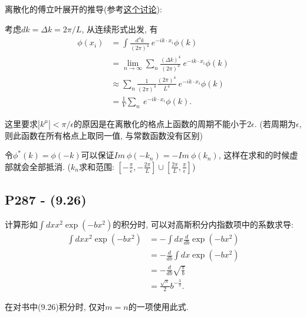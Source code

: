 \documentclass[10pt,b5paper,openany]{book}
\begin{document}
离散化的傅立叶展开的推导(参考\href{https://physics.stackexchange.com/questions/533991/the-discrete-fourier-series-in-peskin-and-schroeder-page-285}{这个讨论}): 

考虑$dk = \Delta k = 2\pi/L$, 从连续形式出发, 有
\begin{equation}
  \begin{aligned}
    \phi(x_i) &= \int \frac{d^4 k}{(2\pi)^4} \ e^{-ik\cdot x_i}\phi(k) \\ 
    &= \lim_{n\rightarrow\infty}\sum_n \frac{(\Delta k)^4}{(2\pi)^4} \ e^{-ik\cdot x_i}\phi(k) \\
    &\approx \sum_n \frac{1}{(2\pi)^4} \frac{(2\pi)^4}{L^4}\ e^{-ik\cdot x_i}\phi(k) \\ 
    &= \frac{1}{V} \sum_n \ e^{-ik\cdot x_i}\phi(k).
  \end{aligned}
\end{equation}

这里要求$|k^{\mu}| < \pi/\epsilon$的原因是在离散化的格点上函数的周期不能小于$2\epsilon$. (若周期为$\epsilon$, 则此函数在所有格点上取同一值, 与常数函数没有区别)

令$\phi^*(k) = \phi(-k)$可以保证$Im\ \phi(-k_n) = -Im\ \phi(k_n)$, 这样在求和的时候虚部就会全部抵消. ($k_n$求和范围: $[-\frac{\pi}{\epsilon}, -\frac{2\pi}{L}]\cup [\frac{2\pi}{L}, \frac{\pi}{\epsilon}]$)

\subsection{P287 - (9.26)}

计算形如$\int dx x^2 \exp(-bx^2)$的积分时, 可以对高斯积分内指数项中的系数求导: 
\begin{equation}
  \begin{aligned}
    \int dx x^2 \exp(-bx^2) &= -\int dx \frac{d}{db}\exp(-bx^2) \\
    &= -\frac{d}{db} \int dx \exp(-bx^2) \\ 
    &= -\frac{d}{db} \sqrt{\frac{\pi}{b}} \\ 
    &= \frac{\sqrt{\pi}}{2}b^{-\frac{3}{2}}. 
  \end{aligned}
\end{equation}

在对书中(9.26)积分时, 仅对$m=n$的一项使用此式. 
\end{document}
